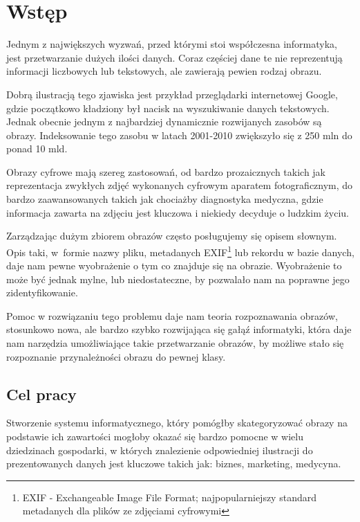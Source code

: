 \chapter*{Wstęp}

Jednym z największych wyzwań, przed którymi stoi współczesna informatyka, jest przetwarzanie dużych ilości danych. Coraz częściej dane te nie reprezentują informacji liczbowych lub tekstowych, ale zawierają pewien rodzaj obrazu. 

Dobrą ilustracją tego zjawiska jest przykład przeglądarki internetowej Google, gdzie początkowo kładziony był nacisk na wyszukiwanie danych tekstowych. Jednak obecnie jednym z najbardziej dynamicznie rozwijanych zasobów są obrazy. Indeksowanie tego zasobu w latach 2001-2010 zwiększyło się z 250 mln do ponad 10 mld.\cite{Google2010}

Obrazy cyfrowe mają szereg zastosowań, od bardzo prozaicznych takich jak reprezentacja zwykłych zdjęć wykonanych cyfrowym aparatem fotograficznym, do bardzo zaawansowanych takich jak chociażby diagnostyka medyczna, gdzie informacja zawarta na zdjęciu jest kluczowa i niekiedy decyduje o ludzkim życiu.

Zarządzając dużym zbiorem obrazów często posługujemy się opisem słownym. Opis taki, w~formie nazwy pliku, metadanych EXIF\footnote{EXIF - Exchangeable Image File Format; najpopularniejszy standard metadanych dla plików ze zdjęciami cyfrowymi} lub rekordu w bazie danych, daje nam pewne wyobrażenie o tym co znajduje się na obrazie. Wyobrażenie to może być jednak mylne, lub niedostateczne, by pozwalało nam na poprawne jego zidentyfikowanie.

Pomoc w rozwiązaniu tego problemu daje nam teoria rozpoznawania obrazów, stosunkowo nowa, ale bardzo szybko rozwijająca się gałąź informatyki, która daje nam narzędzia umożliwiające takie przetwarzanie obrazów, by możliwe stało się rozpoznanie przynależności obrazu do pewnej klasy.\cite{Tad91}


\section*{Cel pracy}

Stworzenie systemu informatycznego, który pomógłby skategoryzować obrazy na podstawie ich zawartości mogłoby okazać się bardzo pomocne w wielu dziedzinach gospodarki, w których znalezienie odpowiedniej ilustracji do prezentowanych danych jest kluczowe takich jak: biznes, marketing, medycyna.

